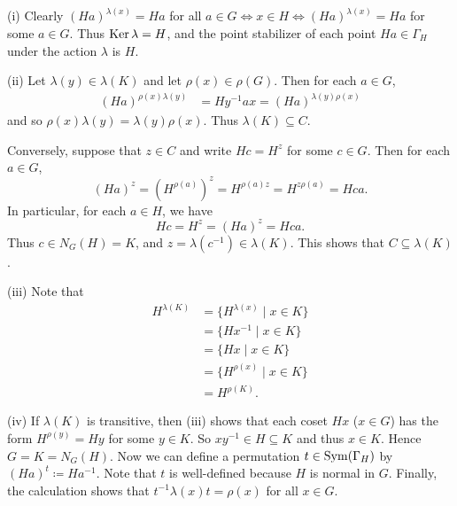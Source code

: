 \begin{sketch}
	(i) Clearly $(Ha)^{\lambda(x)} = Ha$ for all $a \in G \Leftrightarrow x \in H \Leftrightarrow (Ha)^{\lambda(x)} = Ha$ for some $a \in G$. Thus $\operatorname{Ker} \lambda = H$, and the point stabilizer of each point $Ha \in \Gamma_H$ under the action $\lambda$ is $H$.

(ii) Let $\lambda(y)\in \lambda(K)$ and let $\rho(x)\in \rho(G)$. Then for each $a \in G$,
	\begin{align*}
		(Ha)^{\rho(x)\lambda(y)} &= Hy^{-1}ax = (Ha)^{\lambda(y)\rho(x)}
	\end{align*}
	and so $\rho(x)\lambda(y) = \lambda(y)\rho(x)$. Thus $\lambda(K) \subseteq C$.

Conversely, suppose that $z \in C$ and write $Hc=H^z$ for some $c\in G$. Then for each $a \in G$,
\begin{equation*}
	(Ha)^z = (H^{\rho(a)})^z=H^{\rho(a)z} = H^{z\rho(a)} = Hca.
\end{equation*}
	In particular, for each $a \in H$, we have
\begin{equation*}
	Hc= H^z = (Ha)^z = Hca.
\end{equation*}  Thus $c \in N_G(H) = K$, and $z = \lambda(c^{-1}) \in \lambda(K)$. This shows that $C \subseteq \lambda(K)$.

(iii) Note that
\begin{align*}
	H^{\lambda(K)} &= \{H^{\lambda(x)}\mid x\in K\} 
	\\
	&= \{Hx^{-1}\mid x\in K\} 
	\\
	&= \{Hx\mid x\in K\}
	\\
	&= \{H^{\rho(x)}\mid x\in K\}
	\\
	&= H^{\rho(K)}.
\end{align*}

(iv) If $\lambda(K)$ is transitive, then (iii) shows that each coset $Hx$ ($x \in G$) has the form $H^{\rho(y)} = Hy$ for some $y \in K$. So $xy^{-1} \in H\subseteq K$ and thus $x\in K$. Hence $G = K = N_G(H)$. Now we can define a permutation $t \in\operatorname{Sym}(\Gamma_H)$ by $(Ha)^t \coloneq  Ha^{-1}$. Note that $t$ is well-defined because $H$ is normal in $G$. Finally, the calculation shows that $t^{-1}\lambda(x)t = \rho(x)$ for all $x \in G$.
\end{sketch}

